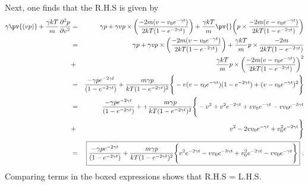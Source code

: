 Next, one finds that the R.H.S is given by
\begin{eqnarray}
\gamma \pv{(vp)} + \frac{\gamma k T}{m} \frac{\partial^2 p}{\partial v^2} &=& \gamma p + \gamma v p \times \bigg( \frac{-2 m (v-v_0 e^{-\gamma t})}{2 k T (1-e^{-2\gamma t})} \bigg) 
+  \frac{\gamma k T}{m} \pv{} \bigg( p \times  \frac{-2 m (v-v_0 e^{-\gamma t})}{2 k T (1-e^{-2\gamma t})}  \bigg) \nonumber \\
&=& \gamma p + \gamma v p \times \bigg( \frac{-2 m (v-v_0 e^{-\gamma t})}{2 k T (1-e^{-2\gamma t})} \bigg) 
+ \frac{\gamma k T}{m}  p \times  \frac{-2 m}{2 k T (1-e^{-2\gamma t})} \nonumber \\
&+& \frac{\gamma k T}{m} p \times \bigg( \frac{-2 m (v-v_0 e^{-\gamma t})}{2 k T (1-e^{-2\gamma t})} \bigg)^2 \nonumber \\
&=& \frac{-\gamma p e^{-2 \gamma t}}{(1-e^{-2 \gamma t})} + \frac{m\gamma p}{k T (1-e^{-2 \gamma t})^2} \Bigg\{ -v (v-v_0 e^{-\gamma t}) (1- e^{-2\gamma t}) +  (v-v_0 e^{-\gamma t})^2\Bigg\} \nonumber \\
&=& \frac{-\gamma p e^{-2 \gamma t}}{(1-e^{-2 \gamma t})} + + \frac{m\gamma p}{k T (1-e^{-2 \gamma t})^2} \Bigg\{ -v^2 + v^2 e^{-2 \gamma t} + v v_0 e^{-\gamma t} - v v_0 e^{-3 \gamma t} \nonumber \\\
&+& v^2 -2 v v_0 e^{-\gamma t} + v_0 ^2 e^{-2 \gamma t} \Bigg\} \nonumber \\
&=& \boxed{\frac{-\gamma p e^{-2 \gamma t}}{(1-e^{-2 \gamma t})} + \frac{m\gamma p}{k T (1-e^{-2 \gamma t})^2} \Bigg\{ v^2 e^{-2 \gamma t} - v v_0 e^{-3 \gamma t} + v_0 ^2 e^{-2 \gamma t} - v v_0 e^{-\gamma t} \Bigg\} }~. \nonumber
\end{eqnarray}
Comparing terms in the boxed expressions shows that R.H.S = L.H.S.